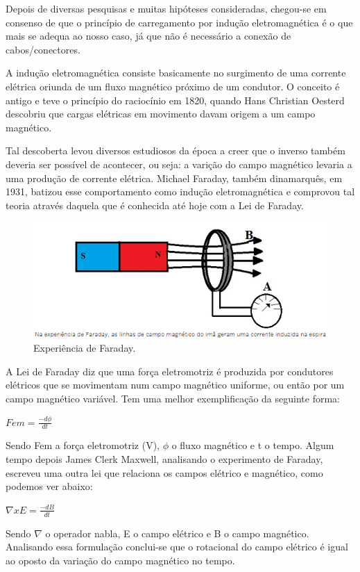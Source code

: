Depois de diversas pesquisas e muitas hipóteses consideradas, chegou-se em consenso de que o princípio de carregamento por indução eletromagnética é o que mais se adequa ao nosso caso, já que não é necessário a conexão de cabos/conectores.

A indução eletromagnética consiste basicamente no surgimento de uma corrente elétrica oriunda de um fluxo magnético próximo de um condutor. O conceito é antigo e teve o princípio do raciocínio em 1820, quando Hans Christian Oesterd descobriu que cargas elétricas em movimento davam origem a um campo magnético.

 Tal descoberta levou diversos estudiosos da época a creer que o inverso também deveria ser possível de acontecer, ou seja: a varição do campo magnético levaria a uma produção de corrente elétrica. Michael Faraday, também dinamarquês, em 1931, batizou esse comportamento como indução eletromagnética e comprovou tal teoria através daquela que é conhecida até hoje com a Lei de Faraday.

 \begin{figure}[H]
	\centering
	\includegraphics[scale=0.7]{figuras/carregador_inducao}
	\caption{Experiência de Faraday.}
	\label{img:faraday}
\end{figure}

A Lei de Faraday diz que uma força eletromotriz é produzida por condutores elétricos que se movimentam num campo magnético uniforme, ou então por um campo magnético variável. Tem uma melhor exemplificação da seguinte forma:


	$Fem = \frac{-d \phi }{dt}$


Sendo Fem a força eletromotriz (V), $\phi$ o fluxo magnético e t o tempo. Algum tempo depois James Clerk Maxwell, analisando o experimento de Faraday, escreveu uma outra lei que relaciona os campos elétrico e magnético, como podemos ver abaixo:


	$\nabla xE = \frac{-dB}{dt}$


Sendo $\nabla$ o operador nabla, E o campo elétrico e B o campo magnético. Analisando essa formulação conclui-se que o rotacional do campo elétrico é igual ao oposto da variação do campo magnético no tempo.


